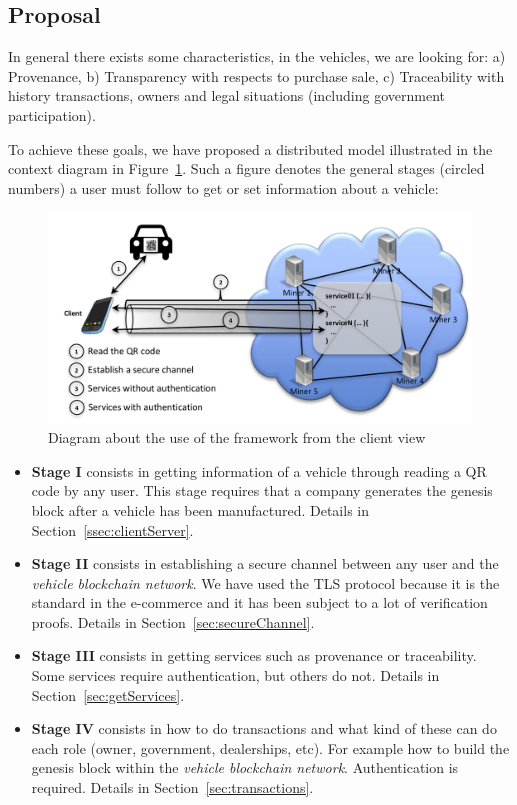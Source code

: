 \subsection{Proposal}
\label{subsec:proposal}
In general there exists some characteristics, in the vehicles, we are looking for:
a) Provenance,
b) Transparency with respects to purchase sale,
c) Traceability with history transactions, owners and legal situations (including  
government participation).

To achieve these goals, we have proposed a distributed model illustrated in the context
diagram in Figure~\ref{fig:flowChartFramework}. Such a figure denotes
the general stages (circled numbers) a user must follow to get or set information about a 
vehicle:
\begin{figure}[hb]
  \centering
    \includegraphics[scale=0.74]{images/lopez2.png}
        \caption{Diagram about the use of the framework from the client view}
    \label{fig:flowChartFramework}
\end{figure}

\begin{itemize}
  \item \textbf{Stage I} consists in getting information of a vehicle through reading
    a QR code by any user.
    This stage requires that a company generates the genesis block after a vehicle has 
    been manufactured. Details in Section~\ref{ssec:clientServer}.
  \item \textbf{Stage II} consists in establishing a secure channel between any user
    and the \textit{vehicle blockchain network}. We
    have used the TLS protocol because it is the standard in the
    e-commerce and it has been subject to a lot of verification proofs.
    Details in Section~\ref{sec:secureChannel}.
  \item \textbf{Stage III} consists in getting services such as provenance or 
    traceability. Some services require authentication, but others do not.
    Details in Section~\ref{sec:getServices}.  
  \item \textbf{Stage IV} consists in how to do transactions and what kind of these can 
    do each role (owner, government, dealerships, etc). For example how to build
    the genesis block within the \textit{vehicle blockchain network}. 
    Authentication is required. 
    Details in Section~\ref{sec:transactions}. 
\end{itemize}


